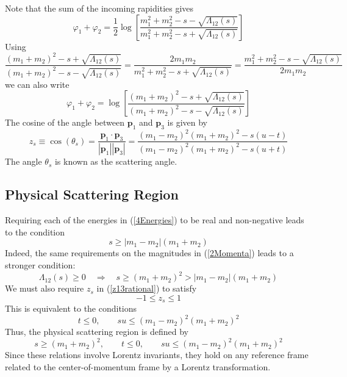 Note that the sum of the incoming rapidities gives
\begin{equation}
	\varphi_{1} + \varphi_{2} = \frac{1}{2} \log{\left[ \frac{m_{1}^{2} + m_{2}^{2} - s - \sqrt{\Lambda_{12}(s)}}{m_{1}^{2} + m_{2}^{2} - s + \sqrt{\Lambda_{12}(s)}} \right]}
\end{equation}
Using
\begin{equation}
	\frac{(m_{1} + m_{2})^{2} - s + \sqrt{\Lambda_{12}(s)}}{(m_{1} + m_{2})^{2} - s - \sqrt{\Lambda_{12}(s)}} = \frac{2m_{1}m_{2}}{m_{1}^{2} + m_{2}^{2} - s + \sqrt{\Lambda_{12}(s)}} = \frac{m_{1}^{2} + m_{2}^{2} - s - \sqrt{\Lambda_{12}(s)}}{2m_{1}m_{2}}
\end{equation}
we can also write
\begin{equation}
	\varphi_{1} + \varphi_{2} = \log{\left[ \frac{(m_{1} + m_{2})^{2} - s + \sqrt{\Lambda_{12}(s)}}{(m_{1} + m_{2})^{2} - s - \sqrt{\Lambda_{12}(s)}} \right]} \label{rap12}
\end{equation}
The cosine of the angle between $\mathbf{p}_{1}$ and $\mathbf{p}_{3}$ is given by
\begin{equation}
	z_{s} \equiv \cos(\theta_{s}) = \frac{\mathbf{p}_{1} \cdot \mathbf{p}_{3}}{|\mathbf{p}_{1}| |\mathbf{p}_{3}|} = \frac{(m_{1} - m_{2})^{2} (m_{1} + m_{2})^{2} - s (u - t)}{(m_{1} - m_{2})^{2} (m_{1} + m_{2})^{2} - s (u + t)} \label{z13rational}
\end{equation}
The angle $\theta_{s}$ is known as the scattering angle.
\subsection{Physical Scattering Region}
Requiring each of the energies in (\ref{4Energies}) to be real and non-negative leads to the condition
\begin{equation}
	s \geq |m_{1} - m_{2}| (m_{1} + m_{2})
\end{equation}
Indeed, the same requirements on the magnitudes in (\ref{2Momenta}) leads to a stronger condition:
\begin{equation}
	\Lambda_{12}(s) \geq 0 \quad \Longrightarrow \quad s \geq (m_{1} + m_{2})^{2} > |m_{1} - m_{2}| (m_{1} + m_{2})
\end{equation}
We must also require $z_{s}$ in (\ref{z13rational}) to satisfy
\begin{equation}
	{-1} \leq z_{s} \leq 1
\end{equation}
This is equivalent to the conditions
\begin{equation}
	t \leq 0, \qquad s u \leq (m_{1} - m_{2})^{2} (m_{1} + m_{2})^{2}
\end{equation}
Thus, the physical scattering region is defined by
\begin{equation}
	s \geq (m_{1} + m_{2})^{2}, \qquad t \leq 0, \qquad s u \leq (m_{1} - m_{2})^{2} (m_{1} + m_{2})^{2}
\end{equation}
Since these relations involve Lorentz invariants, they hold on any reference frame related to the center-of-momentum frame by a Lorentz transformation.
